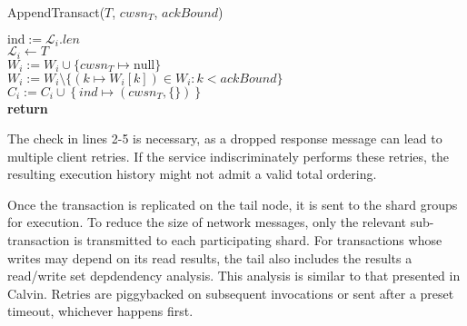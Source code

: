 \documentclass{article}
\begin{document}
\begin{procedure}[H]  
  \caption{AppendTransact($T$, $cwsn_T$, $ackBound$)}
    
  $\text{ind}:=\mathcal{L}_i.len$ \\
  $\mathcal{L}_i \leftarrow T$ \\
  $W_i := W_i \cup \{ cwsn_T \mapsto \text{null}\}$ \\
  $W_i := W_i \setminus \{ (k \mapsto W_i[k]) \in W_i : k < ackBound\}$   
  $C_i := C_i \cup \left \{ind \mapsto (cwsn_T, \{ \}) \right \}$ \\
     
  \textbf{return}
\end{procedure}
\par The check in lines 2-5 is necessary, as a dropped response message can lead to multiple client retries. If the service indiscriminately performs these retries, the resulting execution history might not admit a valid total ordering. 
\par Once the transaction is replicated on the tail node, it is sent to the shard groups for execution. To reduce the size of network messages, only the relevant sub-transaction is transmitted to each participating shard. For transactions whose writes may depend on its read results, the tail also includes the results a read/write set depdendency analysis. This analysis is similar to that presented in Calvin. Retries are piggybacked on subsequent invocations or sent after a preset timeout, whichever happens first. \\
\end{document}
